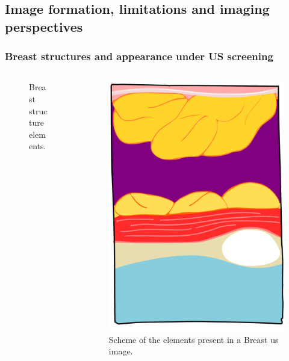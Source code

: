 \graphicspath{{./content/breast/figures/}}

\subsection{Image formation, limitations and imaging perspectives}

\begin{frame}
\frametitle{Breast structures and appearance under US screening}
\vspace{-10pt}
\begin{columns}
  \begin{column}{.48\textwidth}
    \begin{figure}\centering
      \begin{adjustbox}
        {max size={\textwidth}{.60\textheight},keepaspectratio=true}
        
      \end{adjustbox}
      \caption{Breast structure elements.}
    \end{figure}	
  \end{column}

  \begin{column}{.48\textwidth}
    \begin{overprint}
      \begin{figure}\centering
        \includegraphics[width=.75\textwidth]{tissue.pdf}
        \caption{ Scheme of the elements present in a Breast \ac{us} image.}
      \end{figure}	


\end{overprint}
\end{column}
\end{columns}
\end{frame}
